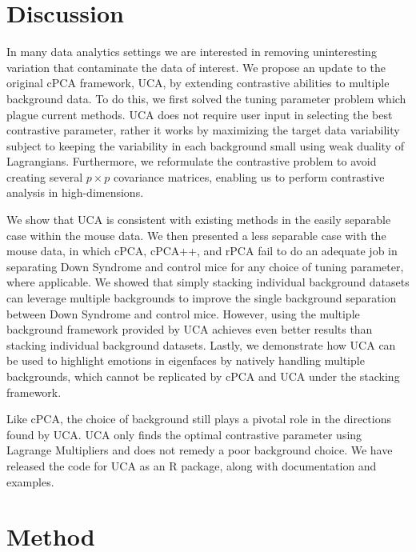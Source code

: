 \documentclass[12pt]{article}
\begin{document}
\section{Discussion}
In many data analytics settings we are interested in removing uninteresting variation that contaminate the data of interest.
We propose an update to the original cPCA framework, UCA, by extending contrastive abilities to multiple background data. To do this, we first solved the tuning parameter problem which plague current methods. UCA does not require user input in selecting the best contrastive parameter, rather it works by maximizing the target data variability subject to keeping the variability in each background small using weak duality of Lagrangians. Furthermore, we reformulate the contrastive problem to avoid creating several $p \times p$ covariance matrices, enabling us to perform contrastive analysis in high-dimensions.

We show that UCA is consistent with existing methods in the easily separable case within the mouse data. We then presented a less separable case with the mouse data, in which cPCA, cPCA++, and rPCA fail to do an adequate job in separating Down Syndrome and control mice for any choice of tuning parameter, where applicable.
We showed that simply stacking individual background datasets can leverage multiple backgrounds to improve the single background separation between Down Syndrome and control mice.
However, using the multiple background framework provided by UCA achieves even better results than stacking individual background datasets. 
Lastly, we demonstrate how UCA can be used to highlight emotions in eigenfaces by natively handling multiple backgrounds, which cannot be replicated by cPCA and UCA under the stacking framework. 

Like cPCA, the choice of background still plays a pivotal role in the directions found by UCA. UCA only finds the optimal contrastive parameter using Lagrange Multipliers and does not remedy a poor background choice.
We have released the code for UCA as an R package, along with documentation and examples.



\section{Method}

\end{document}
